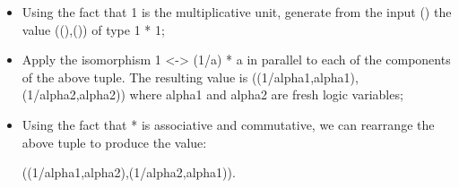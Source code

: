 \documentclass[preprint]{sigplanconf}
\begin{document}
\begin{itemize}
\item Using the fact that {{1}} is the multiplicative unit, generate
  from the input {{()}} the value {{((),())}} of type {{1 * 1}};
\item Apply the isomorphism {{1 <-> (1/a) * a}} in parallel to each of
  the components of the above tuple. The resulting value is
  {{((1/alpha1,alpha1),(1/alpha2,alpha2))}} where {{alpha1}} and
  {{alpha2}} are fresh logic variables;
\item Using the fact that {{*}} is associative and commutative, we can
  rearrange the above tuple to produce the value:

{{((1/alpha1,alpha2),(1/alpha2,alpha1))}}.





\end{itemize}
\end{document}
